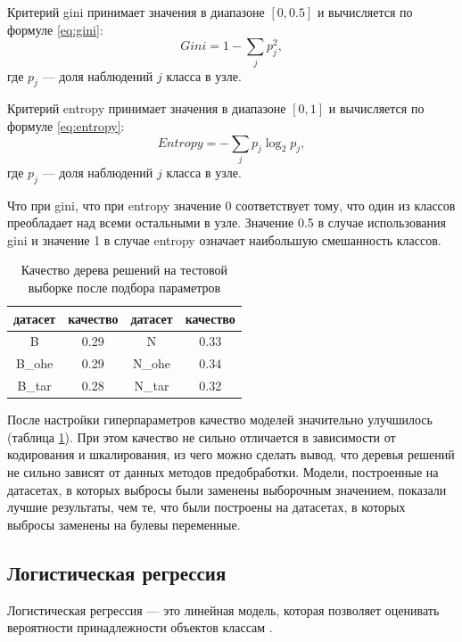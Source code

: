 \documentclass[14pt]{mmcs_article}
\begin{document}
Критерий gini принимает значения в диапазоне $[0, 0.5]$ и вычисляется по формуле \ref{eq:gini}:
\begin{equation}\label{eq:gini}
	Gini = 1 - \sum_j p_j^2,
\end{equation}
где $p_j$ --- доля наблюдений $j$ класса в узле.

Критерий entropy принимает значения в диапазоне $[0, 1]$ и вычисляется по формуле \ref{eq:entropy}:
\begin{equation}\label{eq:entropy}
	Entropy = - \sum_j p_j \log_2 p_j,
\end{equation}
где $p_j$ --- доля наблюдений $j$ класса в узле.

Что при gini, что при entropy значение 0 соответствует тому, что один из классов преобладает над всеми остальными в узле. Значение 0.5 в случае использования gini и значение 1 в случае entropy означает наибольшую смешанность классов.


\begin{table}[H]
	\centering
	\caption{Качество дерева решений на тестовой выборке после подбора параметров}\label{models:table2}
	\begin{tabular}{cccc}
		\hline
		датасет & качество	& датасет & качество \\
		\hline
		B &	0.29 &	N &	0.33 \\
		B\_ohe & 0.29 &	N\_ohe & 0.34\\
		B\_tar & 0.28 & N\_tar & 0.32 \\
		\hline
	\end{tabular}
\end{table}

После настройки гиперпараметров качество моделей значительно улучшилось (таблица \ref{models:table2}). При этом качество не сильно отличается в зависимости от кодирования и шкалирования, из чего можно сделать вывод, что деревья решений не сильно зависят от данных методов предобработки. Модели, построенные на датасетах, в которых выбросы были заменены выборочным значением, показали лучшие результаты, чем те, что были построены на датасетах, в которых выбросы заменены на булевы переменные. 


\subsection{Логистическая регрессия}

Логистическая регрессия --- это линейная модель, которая позволяет оценивать вероятности принадлежности объектов классам \cite{lib:logreg}.
\end{document}
